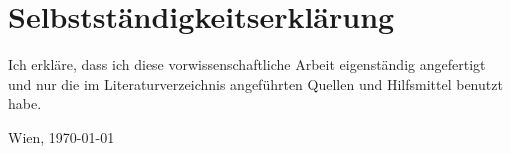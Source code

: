 \documentclass[DLS,
	inreferencehack,
	ohneVgl=false,
	ohneS=false,
	scauthor,
	rundeauslassung=false,
	bookstyle=false,
	widowlines=3,
	titlepage=DLS2017,
	listof=nochaptergap,
	doppelpunkt=false,
	postnotedoppelpunkt=false,
	zitierstil=klassisch]{vwa}
\begin{document}
\frontmatter

\maketitle





\cleardoublepage{}
\tableofcontents

\mainmatter





%



\listoffigures
\withoutclearpage{\listoftables}

\appendix
% 


\backmatter

\section*{Selbstständigkeitserklärung}
\thispagestyle{plain}
Ich erkläre, dass ich diese vorwissenschaftliche Arbeit eigenständig
angefertigt und nur die im Literaturverzeichnis angeführten Quellen und
Hilfsmittel benutzt habe.

\vspace{2cm}\noindent Wien, \today

\vspace{2cm}\noindent\makeatletter\@AutorIn\makeatother
\end{document}
